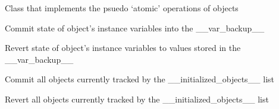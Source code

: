 \documentclass[letterpaper,10pt,english]{sphinxmanual}
\begin{document}
\begin{fulllineitems}
\label{\detokenize{index:atomic.Atomic}}
Class that implements the psuedo ‘atomic’ operations of objects

\begin{fulllineitems}
\label{\detokenize{index:atomic.Atomic.commit}}
Commit state of object’s instance variables into the \_\_var\_backup\_\_

\end{fulllineitems}


\begin{fulllineitems}
\label{\detokenize{index:atomic.Atomic.revert}}
Revert state of object’s instance variables to values stored in
the \_\_var\_backup\_\_

\end{fulllineitems}


\end{fulllineitems}


\begin{fulllineitems}
\label{\detokenize{index:atomic.commit}}
Commit all objects currently tracked by the
\_\_initialized\_objects\_\_ list

\end{fulllineitems}


\begin{fulllineitems}
\label{\detokenize{index:atomic.revert}}
Revert all objects currently tracked by the
\_\_initialized\_objects\_\_ list

\end{fulllineitems}
\end{document}
